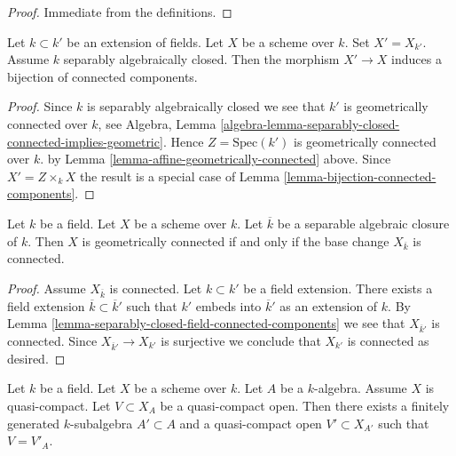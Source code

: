 \begin{proof}
Immediate from the definitions.
\end{proof}

\begin{lemma}
\label{lemma-separably-closed-field-connected-components}
Let $k \subset k'$ be an extension of fields.
Let $X$ be a scheme over $k$. Set $X' = X_{k'}$.
Assume $k$ separably algebraically closed.
Then the morphism $X' \to X$ induces a bijection of connected
components.
\end{lemma}

\begin{proof}
Since $k$ is separably algebraically closed we see that
$k'$ is geometrically connected over $k$, see Algebra,
Lemma \ref{algebra-lemma-separably-closed-connected-implies-geometric}.
Hence $Z = \text{Spec}(k')$ is geometrically connected over $k$.
by Lemma \ref{lemma-affine-geometrically-connected} above.
Since $X' = Z \times_k X$ the result is a special case
of Lemma \ref{lemma-bijection-connected-components}.
\end{proof}

\begin{lemma}
\label{lemma-characterize-geometrically-connected}
Let $k$ be a field.
Let $X$ be a scheme over $k$.
Let $\overline{k}$ be a separable algebraic closure of $k$.
Then $X$ is geometrically connected if and only if the base change
$X_{\overline{k}}$ is connected.
\end{lemma}

\begin{proof}
Assume $X_{\overline{k}}$ is connected.
Let $k \subset k'$ be a field extension.
There exists a field extension $\overline{k} \subset \overline{k}'$
such that $k'$ embeds into $\overline{k}'$ as an extension of $k$.
By Lemma \ref{lemma-separably-closed-field-connected-components}
we see that $X_{\overline{k}'}$ is connected.
Since $X_{\overline{k}'} \to X_{k'}$ is surjective we conclude
that $X_{k'}$ is connected as desired.
\end{proof}

\begin{lemma}
\label{lemma-descend-open}
Let $k$ be a field.
Let $X$ be a scheme over $k$.
Let $A$ be a $k$-algebra.
Assume $X$ is quasi-compact.
Let $V \subset X_A$ be a quasi-compact open.
Then there exists a finitely generated $k$-subalgebra $A' \subset A$
and a quasi-compact open $V' \subset X_{A'}$
such that $V = V'_A$.
\end{lemma}

